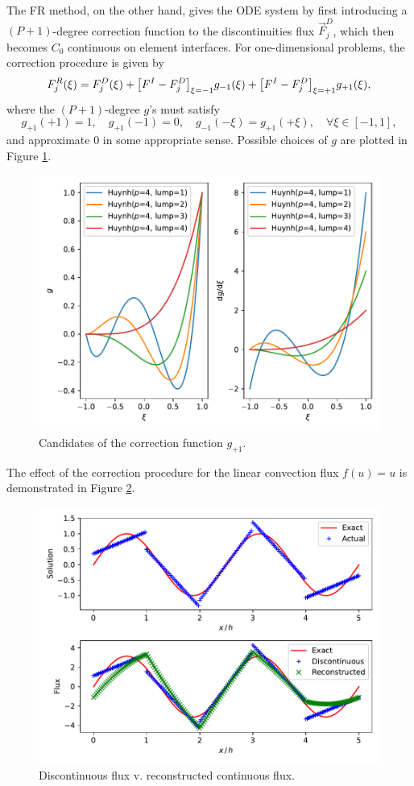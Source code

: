 \documentclass[10pt,draft]{article}
\begin{document}
%
The FR method, on the other hand, gives the ODE system by first introducing a $(P+1)$-degree correction function to the discontinuities flux $\vec{F}_j^{D}$, which then becomes $C_0$ continuous on element interfaces.
%
For one-dimensional problems, the correction procedure is given by
$$
F_j^{R}(\xi)=F_j^{D}(\xi) + \qty[F^{I}-F_j^{D}]_{\xi=-1} g_{-1}(\xi) + \qty[F^{I}-F_j^{D}]_{\xi=+1} g_{+1}(\xi),
$$
where the $(P+1)$-degree $g$'s must satisfy
$$
g_{+1}(+1)=1,\quad
g_{+1}(-1)=0,\quad
g_{-1}(-\xi)=g_{+1}(+\xi),\quad \forall\xi\in[-1,1],
$$
and approximate $0$ in some appropriate sense.
Possible choices of $g$ are plotted in Figure \ref{fr:lumping}.
%
\begin{figure}[H]
  \centering
  \includegraphics[width=.8\textwidth]{./fr/HuynhLumping.pdf}
  \caption{Candidates of the correction function $g_{+1}$.}
  \label{fr:lumping}
\end{figure}
%
The effect of the correction procedure for the linear convection flux $f(u)=u$ is demonstrated in Figure \ref{fr:compare}.
\begin{figure}[H]
  \centering
  \includegraphics[width=.8\textwidth]{./fr/FRonLegendreRoots.pdf}
  \caption{Discontinuous flux v. reconstructed continuous flux.}
  \label{fr:compare}
\end{figure}
\end{document}
